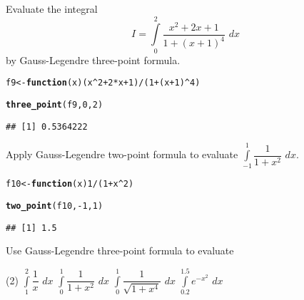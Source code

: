 \documentclass[11pt, a4paper]{article}\usepackage[]{graphicx}\usepackage[]{xcolor}
\makeatletter
\newcommand{\hlnum}[1]{\textcolor[rgb]{0.686,0.059,0.569}{#1}}%
\newcommand{\hlopt}[1]{\textcolor[rgb]{0,0,0}{#1}}%
\newcommand{\hldef}[1]{\textcolor[rgb]{0.345,0.345,0.345}{#1}}%
\newcommand{\hlkwa}[1]{\textcolor[rgb]{0.161,0.373,0.58}{\textbf{#1}}}%
\newcommand{\hlkwb}[1]{\textcolor[rgb]{0.69,0.353,0.396}{#1}}%
\newcommand{\hlkwc}[1]{\textcolor[rgb]{0.333,0.667,0.333}{#1}}%
\newcommand{\hlkwd}[1]{\textcolor[rgb]{0.737,0.353,0.396}{\textbf{#1}}}%
\newenvironment{kframe}{%
 \def\at@end@of@kframe{}%
 \ifinner\ifhmode%
  \def\at@end@of@kframe{\end{minipage}}%
  \begin{minipage}{\columnwidth}%
 \fi\fi%
 \def\FrameCommand##1{\hskip\@totalleftmargin \hskip-\fboxsep
 \colorbox{shadecolor}{##1}\hskip-\fboxsep
     \hskip-\linewidth \hskip-\@totalleftmargin \hskip\columnwidth}%
 \MakeFramed {\advance\hsize-\width
   \@totalleftmargin\z@ \linewidth\hsize
   \@setminipage}}%
 {\par\unskip\endMakeFramed%
 \at@end@of@kframe}
\newenvironment{knitrout}{}{} %
\makeatother
\begin{document}
\leftpointright \hspace{0.5cm} Evaluate the integral $$I = \int \limits_{0}^{2} \dfrac{x^2 + 2x + 1}{1 + (x+1)^4} \,\, dx$$ by Gauss-Legendre three-point formula.

\begin{knitrout}
\color{fgcolor}\begin{kframe}
\begin{alltt}
\hldef{f9} \hlkwb{<-} \hlkwa{function}\hldef{(}\hlkwc{x}\hldef{) (x}\hlopt{^}\hlnum{2} \hlopt{+} \hlnum{2}\hlopt{*}\hldef{x} \hlopt{+} \hlnum{1}\hldef{)} \hlopt{/} \hldef{(}\hlnum{1} \hlopt{+} \hldef{(x} \hlopt{+} \hlnum{1}\hldef{)}\hlopt{^}\hlnum{4}\hldef{)}

\hlkwd{three_point}\hldef{(f9,} \hlnum{0}\hldef{,} \hlnum{2}\hldef{)}
\end{alltt}
\begin{verbatim}
## [1] 0.5364222
\end{verbatim}
\end{kframe}
\end{knitrout}

\leftpointright \hspace{0.5cm} Apply Gauss-Legendre two-point formula to evaluate $\displaystyle{\int \limits_{-1}^{1} \dfrac{1}{1 + x^2} \,\, dx}$.

\begin{knitrout}
\color{fgcolor}\begin{kframe}
\begin{alltt}
\hldef{f10} \hlkwb{<-} \hlkwa{function}\hldef{(}\hlkwc{x}\hldef{)} \hlnum{1} \hlopt{/} \hldef{(}\hlnum{1} \hlopt{+} \hldef{x}\hlopt{^}\hlnum{2}\hldef{)}

\hlkwd{two_point}\hldef{(f10,} \hlopt{-}\hlnum{1}\hldef{,} \hlnum{1}\hldef{)}
\end{alltt}
\begin{verbatim}
## [1] 1.5
\end{verbatim}
\end{kframe}
\end{knitrout}

\newpage

\leftpointright \hspace{0.5cm} Use Gauss-Legendre three-point formula to evaluate
	\begin{tasks}(2)
		\task $\displaystyle{\int \limits_{1}^{2} \dfrac{1}{x} \,\, dx}$
		\task $\displaystyle{\int \limits_{0}^{1} \dfrac{1}{1 + x^2} \,\, dx}$
		\task $\displaystyle{\int \limits_{0}^{1} \dfrac{1}{\sqrt{1 + x^4}}\,\,dx}$
		\task $\displaystyle{\int \limits_{0.2}^{1.5} e^{-x^2} \,\, dx}$
	\end{tasks}
\end{document}
